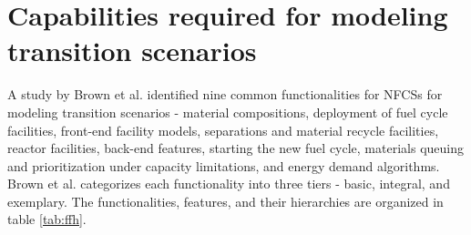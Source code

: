 \section{Capabilities required for modeling transition scenarios}
A study by Brown et al. \cite{brown_identification_2016}
identified nine common functionalities for \glspl{NFCS} for modeling
transition scenarios - material compositions, deployment of fuel
cycle facilities, front-end facility models, separations and material
recycle facilities, reactor facilities, back-end features, starting
the new fuel cycle, materials queuing and prioritization under
capacity limitations, and energy demand algorithms. Brown et al.
categorizes each functionality into three tiers - basic, integral,
and exemplary. The functionalities, features, and their hierarchies
are organized in table \ref{tab:ffh}.


